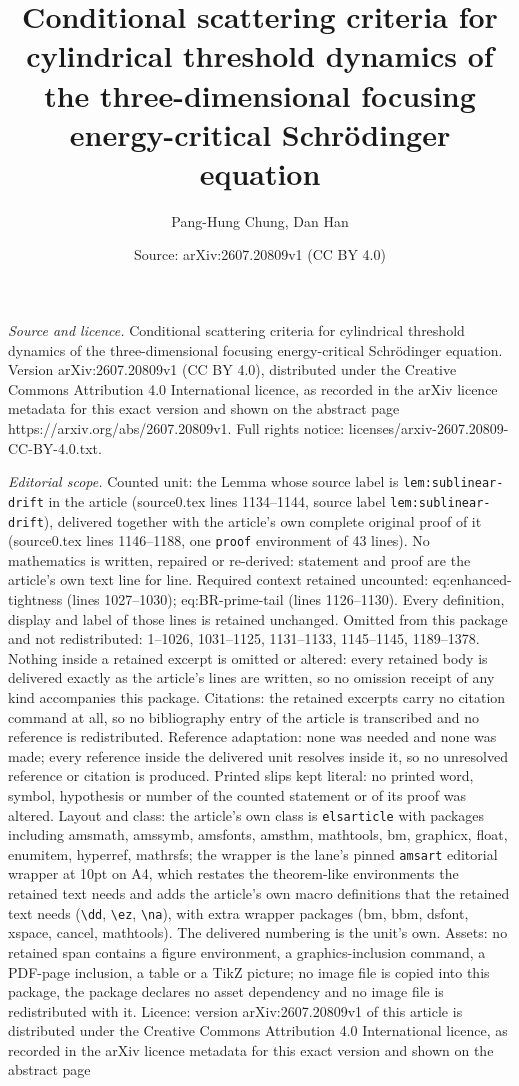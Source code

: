 \documentclass[10pt,a4paper]{amsart}
\title[Conditional scattering criteria for cylindrical threshold dy]{Conditional scattering criteria for cylindrical threshold dynamics of the three-dimensional focusing energy-critical Schr\"odinger equation}
\author{Pang-Hung Chung, Dan Han}
\date{Source: arXiv:2607.20809v1 (CC BY 4.0)}
\begin{document}
\maketitle

\noindent\emph{Source and licence.} Conditional scattering criteria for cylindrical threshold dynamics of the three-dimensional focusing energy-critical Schr\"odinger equation. Version arXiv:2607.20809v1 (CC BY 4.0), distributed under the Creative Commons Attribution 4.0 International licence, as recorded in the arXiv licence metadata for this exact version and shown on the abstract page https://arxiv.org/abs/2607.20809v1. Full rights notice: licenses/arxiv-2607.20809-CC-BY-4.0.txt.\par\smallskip

\noindent\textit{Editorial scope.} Counted unit: the Lemma whose source label is \texttt{lem:sublinear-drift} in the article (source0.tex lines 1134--1144, source label \texttt{lem:sublinear-drift}), delivered together with the article's own complete original proof of it (source0.tex lines 1146--1188, one \texttt{proof} environment of 43 lines). No mathematics is written, repaired or re-derived: statement and proof are the article's own text line for line. Required context retained uncounted: eq:enhanced-tightness (lines 1027--1030); eq:BR-prime-tail (lines 1126--1130). Every definition, display and label of those lines is retained unchanged. Omitted from this package and not redistributed: 1--1026, 1031--1125, 1131--1133, 1145--1145, 1189--1378. Nothing inside a retained excerpt is omitted or altered: every retained body is delivered exactly as the article's lines are written, so no omission receipt of any kind accompanies this package. Citations: the retained excerpts carry no citation command at all, so no bibliography entry of the article is transcribed and no reference is redistributed. Reference adaptation: none was needed and none was made; every reference inside the delivered unit resolves inside it, so no unresolved reference or citation is produced. Printed slips kept literal: no printed word, symbol, hypothesis or number of the counted statement or of its proof was altered. Layout and class: the article's own class is \texttt{elsarticle} with packages including amsmath, amssymb, amsfonts, amsthm, mathtools, bm, graphicx, float, enumitem, hyperref, mathrsfs; the wrapper is the lane's pinned \texttt{amsart} editorial wrapper at 10pt on A4, which restates the theorem-like environments the retained text needs and adds the article's own macro definitions that the retained text needs (\texttt{\textbackslash dd}, \texttt{\textbackslash ez}, \texttt{\textbackslash na}), with extra wrapper packages (bm, bbm, dsfont, xspace, cancel, mathtools). The delivered numbering is the unit's own. Assets: no retained span contains a figure environment, a graphics-inclusion command, a PDF-page inclusion, a table or a TikZ picture; no image file is copied into this package, the package declares no asset dependency and no image file is redistributed with it. Licence: version arXiv:2607.20809v1 of this article is distributed under the Creative Commons Attribution 4.0 International licence, as recorded in the arXiv licence metadata for this exact version and shown on the abstract page 
\end{document}
